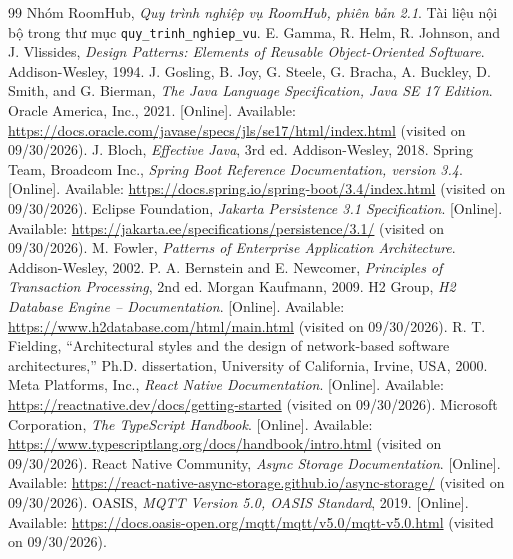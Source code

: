 \begin{thebibliography}{99}
 Nhóm RoomHub, \textit{Quy trình nghiệp vụ RoomHub, phiên bản 2.1}. Tài liệu nội bộ trong thư mục \texttt{quy\_trinh\_nghiep\_vu}.
 E. Gamma, R. Helm, R. Johnson, and J. Vlissides, \textit{Design Patterns: Elements of Reusable Object-Oriented Software}. Addison-Wesley, 1994.
 J. Gosling, B. Joy, G. Steele, G. Bracha, A. Buckley, D. Smith, and G. Bierman, \textit{The Java Language Specification, Java SE 17 Edition}. Oracle America, Inc., 2021. [Online]. Available: \url{https://docs.oracle.com/javase/specs/jls/se17/html/index.html} (visited on 09/30/2026).
 J. Bloch, \textit{Effective Java}, 3rd ed. Addison-Wesley, 2018.
 Spring Team, Broadcom Inc., \textit{Spring Boot Reference Documentation, version 3.4}. [Online]. Available: \url{https://docs.spring.io/spring-boot/3.4/index.html} (visited on 09/30/2026).
 Eclipse Foundation, \textit{Jakarta Persistence 3.1 Specification}. [Online]. Available: \url{https://jakarta.ee/specifications/persistence/3.1/} (visited on 09/30/2026).
 M. Fowler, \textit{Patterns of Enterprise Application Architecture}. Addison-Wesley, 2002.
 P. A. Bernstein and E. Newcomer, \textit{Principles of Transaction Processing}, 2nd ed. Morgan Kaufmann, 2009.
 H2 Group, \textit{H2 Database Engine -- Documentation}. [Online]. Available: \url{https://www.h2database.com/html/main.html} (visited on 09/30/2026).
 R. T. Fielding, ``Architectural styles and the design of network-based software architectures,'' Ph.D. dissertation, University of California, Irvine, USA, 2000.
 Meta Platforms, Inc., \textit{React Native Documentation}. [Online]. Available: \url{https://reactnative.dev/docs/getting-started} (visited on 09/30/2026).
 Microsoft Corporation, \textit{The TypeScript Handbook}. [Online]. Available: \url{https://www.typescriptlang.org/docs/handbook/intro.html} (visited on 09/30/2026).
 React Native Community, \textit{Async Storage Documentation}. [Online]. Available: \url{https://react-native-async-storage.github.io/async-storage/} (visited on 09/30/2026).
 OASIS, \textit{MQTT Version 5.0, OASIS Standard}, 2019. [Online]. Available: \url{https://docs.oasis-open.org/mqtt/mqtt/v5.0/mqtt-v5.0.html} (visited on 09/30/2026).

\end{thebibliography}
